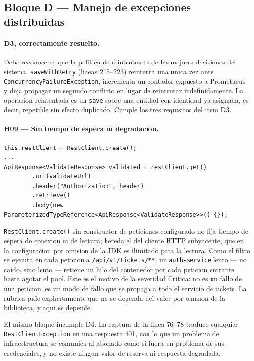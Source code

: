 \documentclass[10pt,a4paper]{article}
\begin{document}
\subsection{Bloque D --- Manejo de excepciones distribuidas}

\paragraph{D3, correctamente resuelto.}
Debe reconocerse que la politica de reintentos es de las mejores decisiones del sistema.
\texttt{saveWithRetry} (lineas 215--223) reintenta una unica vez ante
\texttt{ConcurrencyFailureException}, incrementa un contador expuesto a Prometheus y deja
propagar un segundo conflicto en lugar de reintentar indefinidamente. La operacion
reintentada es un \texttt{save} sobre una entidad con identidad ya asignada, es decir,
repetible sin efecto duplicado. Cumple los tres requisitos del item D3.

\paragraph{H09 --- Sin tiempo de espera ni degradacion.}
\begin{lstlisting}[caption={\texttt{svc-principal/.../config/AuthGatewayFilter.java}, lineas 40 y 60--65},firstnumber=40]
this.restClient = RestClient.create();
...
ApiResponse<ValidateResponse> validated = restClient.get()
        .uri(validateUrl)
        .header("Authorization", header)
        .retrieve()
        .body(new ParameterizedTypeReference<ApiResponse<ValidateResponse>>() {});
\end{lstlisting}

\texttt{RestClient.create()} sin constructor de peticiones configurado no fija tiempo de
espera de conexion ni de lectura; hereda el del cliente HTTP subyacente, que en la
configuracion por omision de la JDK es ilimitado para la lectura. Como el filtro se ejecuta
en cada peticion a \texttt{/api/v1/tickets/**}, un \texttt{auth-service} lento --- no caido,
sino lento --- retiene un hilo del contenedor por cada peticion entrante hasta agotar el
pool. Este es el motivo de la severidad Critica: no es un fallo de una peticion, es un modo
de fallo que se propaga a todo el servicio de tickets. La rubrica pide explicitamente que no
se dependa del valor por omision de la biblioteca, y aqui se depende.

El mismo bloque incumple D4. La captura de la linea 76--78 traduce cualquier
\texttt{RestClientException} en una respuesta 401, con lo que un problema de infraestructura
se comunica al abonado como si fuera un problema de sus credenciales, y no existe ningun
valor de reserva ni respuesta degradada.
\end{document}
